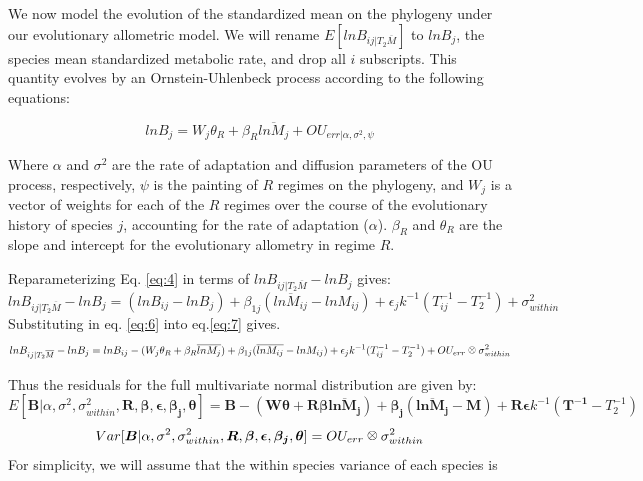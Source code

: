 \documentclass[a4paper,11pt]{article}
\newcommand{\kronecker}{\raisebox{1pt}{\ensuremath{\:\otimes\:}}}
\begin{document}
We now model the evolution of the standardized mean on the phylogeny under our evolutionary allometric model. We will rename $E[lnB_{ij|T_2\overline{M}}]$	to $lnB_j$, the species mean standardized metabolic rate, and drop all $i$ subscripts. This quantity evolves by an Ornstein-Uhlenbeck process according to the following equations:

\begin{equation}\label{eq:6}
lnB_j = W_j\theta_R + \beta_{R}\overline{lnM_j} + OU_{err | \alpha, \sigma^2, \psi}
\end{equation}

Where $\alpha$ and $\sigma^2$ are the rate of adaptation and diffusion parameters of the OU process, respectively, $\psi$ is the painting of $R$ regimes on the phylogeny, and $W_j$ is a vector of weights for each of the $R$ regimes over the course of the evolutionary history of species $j$, accounting for the rate of adaptation ($\alpha$). $\beta_{R}$ and $\theta_R$ are the slope and intercept for the evolutionary allometry in regime $R$. 

Reparameterizing Eq. \ref{eq:4} in terms of $lnB_{ij|T_2\overline{M}} - lnB_j$ gives:
\begin{equation}\label{eq:7}
lnB_{ij|T_2\overline{M}} - lnB_j= (lnB_{ij} - lnB_j) + \beta_{1j}(\overline{lnM_{ij}} - lnM_{ij}) + \epsilon_jk^{-1} (T_{ij}^{-1} - T_2^{-1}) + \sigma^2_{within}
\end{equation}
Substituting in eq. \ref{eq:6} into eq.\ref{eq:7} gives.
\begin{equation}\label{eq:8}
 lnB_{ij|T_2\overline{M}} - lnB_j = lnB_{ij}-(W_j\theta_R + \beta_{R}\overline{lnM_j}) + \beta_{1j}(\overline{lnM_{ij}} - lnM_{ij}) + \epsilon_jk^{-1} (T_{ij}^{-1} - T_2^{-1}) + OU_{err}\kronecker\sigma^2_{within}
\end{equation}

Thus the residuals for the full multivariate normal distribution are given by:
\begin{equation}
E[\boldsymbol{B} |\alpha, \sigma^2, \sigma^2_{within}, \boldsymbol{R}, \boldsymbol{\beta}, \boldsymbol{\epsilon}, \boldsymbol{\beta_j},\boldsymbol{\theta}] = \boldsymbol{B} - (\boldsymbol{W}\boldsymbol{\theta} + \boldsymbol{R\beta}\boldsymbol{\overline{lnM_j}}) +
\boldsymbol{\beta_{j}}(\boldsymbol{\overline{lnM_{j}}} - \boldsymbol{M}) +  \boldsymbol{R\epsilon}k^{-1}(\boldsymbol{T^{-1}} - T_2^{-1})
\end{equation}
\begin{equation}
Var[\boldsymbol{B} |\alpha, \sigma^2, \sigma^2_{within}, \boldsymbol{R}, \boldsymbol{\beta}, \boldsymbol{\epsilon}, \boldsymbol{\beta_j},\boldsymbol{\theta}] = OU_{err} \kronecker \sigma^2_{within}
\end{equation}
For simplicity, we will assume that the within species variance of each species is 
\end{document}
